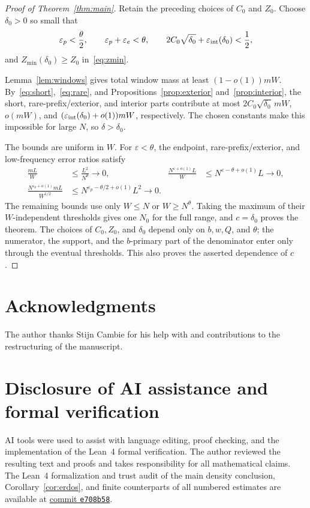 \documentclass[a4paper,10pt]{amsart}
\theoremstyle{remark}
\begin{document}
\begin{proof}[Proof of Theorem~\ref{thm:main}]
Retain the preceding choices of $C_0$ and $Z_0$.
Choose $\delta_0>0$ so small that
\[
 \varepsilon_p<\frac\theta2,\qquad
 \varepsilon_p+\varepsilon_e<\theta,\qquad
 2C_0\sqrt{\delta_0}+\varepsilon_{\rm int}(\delta_0)<\frac12,
\]
and $Z_{\min}(\delta_0)\ge Z_0$ in~\eqref{eq:zmin}.

Lemma~\ref{lem:windows} gives total window mass at least $(1-o(1))mW$.
By~\eqref{eq:short},~\eqref{eq:rare}, and Propositions~\ref{prop:exterior}
and~\ref{prop:interior}, the short, rare-prefix/exterior, and interior parts
contribute at most $2C_0\sqrt{\delta_0}\,mW$, $o(mW)$, and
$(\varepsilon_{\rm int}(\delta_0)+o(1))mW$, respectively. The chosen constants
make this impossible for large $N$, so $\delta>\delta_0$.

The bounds are uniform in $W$. For $\varepsilon<\theta$, the endpoint,
rare-prefix/exterior, and low-frequency error ratios satisfy
\[
\begin{aligned}
 \frac{mL}{W}&\le\frac{L^2}{N^\theta}\to0,&
 \frac{N^{\varepsilon+o(1)}L}{W}
   &\le N^{\varepsilon-\theta+o(1)}L\to0,\\
 \frac{N^{\varepsilon_p+o(1)}mL}{W^{1/2}}
   &\le N^{\varepsilon_p-\theta/2+o(1)}L^2\to0.
\end{aligned}
\]
The remaining bounds use only $W\le N$ or $W\ge N^\theta$. Taking the maximum
of their $W$-independent thresholds gives one $N_0$ for the full range, and
$c=\delta_0$ proves the theorem. The choices of $C_0,Z_0$, and $\delta_0$
depend only on $b,w,Q$, and $\theta$; the numerator, the support, and the
$b$-primary part of the denominator enter only through the eventual
thresholds. This also proves the asserted dependence of $c$.
\end{proof}

\section*{Acknowledgments}

The author thanks Stijn Cambie for his help with and contributions to the
restructuring of the manuscript.

\section*{Disclosure of AI assistance and formal verification}

AI tools were used to assist with language editing, proof checking, and the
implementation of the Lean~4 formal verification. The author reviewed the
resulting text and proofs and takes responsibility for all mathematical
claims. The Lean~4 formalization and trust audit of the main density
conclusion, Corollary~\ref{cor:erdos}, and finite counterparts of all numbered
estimates are available at
\href{https://github.com/Hanziwww/erdos260/tree/e708b584c9a3b54857f050d6b7efbecb8a5ea27a}{commit \texttt{e708b58}}.
\end{document}
